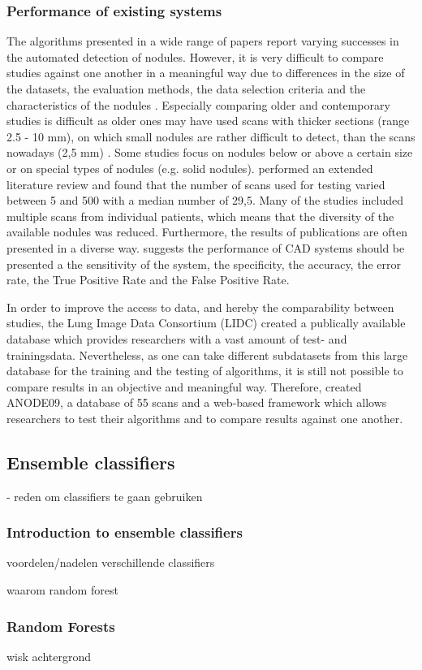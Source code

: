 \subsubsection{Performance of existing systems}
 The algorithms presented in a wide range of papers report varying
 successes in the automated detection of nodules. However, it is very difficult
 to compare studies against one another in a meaningful way due to differences
 in the size of the datasets, the evaluation methods, the data selection
 criteria and the characteristics of the nodules \cite{lee2010}. Especially comparing older and contemporary studies is
 difficult as older ones may have used scans with thicker sections (range 2.5 -
 10 mm), on which small nodules are rather difficult to detect, than the scans
 nowadays (2,5 mm) \cite{lee2010} \cite{ginneken} \cite{mur}. Some studies
 focus on nodules below or above a certain size or on special types of nodules
 (e.g. solid nodules). \cite{mur} performed an extended
 literature review and found that the number of scans used for testing varied between 5 and 500 with a
 median number of 29,5. Many of the studies included multiple scans from
 individual patients, which means that the diversity of the available nodules
 was reduced. Furthermore, the results of publications are often presented in a
 diverse way. \cite{results} suggests the performance of CAD systems should be
 presented a the sensitivity of the system, the specificity, the accuracy, the
 error rate, the True Positive Rate and the False Positive Rate.
 
 In order to improve the access to data, and hereby the comparability between
 studies, the Lung Image Data Consortium (LIDC) created a publically available
 database which provides researchers with a vast amount of test- and
 trainingsdata. Nevertheless, as one can take different subdatasets from this
 large database for the training and the testing of algorithms, it is still not
 possible to compare results in an objective and meaningful way. Therefore,
 \cite{ginneken} created ANODE09, a database of 55 scans and a web-based
 framework which allows researchers to test their algorithms and to
 compare results against one another.
 
\subsection{Ensemble classifiers}
- reden om classifiers te gaan gebruiken

\subsubsection{Introduction to ensemble classifiers}
voordelen/nadelen verschillende classifiers

waarom random forest

\subsubsection{Random Forests}
wisk achtergrond





